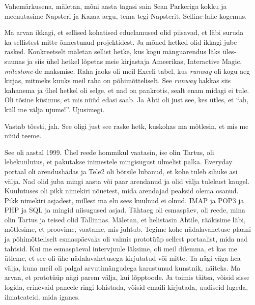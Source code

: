 Vahemärkusena, mäletan, mõni aasta  tagasi sain Sean Parkeriga kokku 
ja meenutasime  Napsteri ja Kazaa aegu, tema tegi Napsterit. Selline lahe 
kogemus.

Ma arvan ikkagi, et sellised kohatised eduelamused olid piisavad, et  läbi 
suruda ka sellistest mitte õnnestunud projektidest. Ja mõned hetked olid ikkagi 
jube rasked. Konkreetselt mäletan  sellist hetke, kus kogu mänguarendus läks 
üles-suunas ja siis ühel hetkel lõpetas meie kirjastaja Ameerikas, Interactive 
Magic, \emph{milestone}-de maksmise. Raha jaoks oli meil Exceli tabel, kus 
\emph{runway} oli kogu aeg kirjas, mitmeks kuuks  meil raha on põhimõtteliselt. 
See \emph{runway} hakkas siis kahanema ja ühel hetkel oli selge, et nad on 
pankrotis, sealt enam midagi ei tule. Oli tõsine küsimus, et mis nüüd edasi 
saab. Ja Ahti oli just see, kes ütles, et \enquote{ah, 
küll me välja ujume!}. Ujusimegi.


Vastab tõesti, jah. See oligi just see raske hetk, kuskohas ma mõtlesin, et mis 
me nüüd teeme.


See oli aastal 1999. Ühel reede hommikul vaatasin, ise olin Tartus, oli 
lehekuulutus, et pakutakse inimestele mingisugust ulmelist palka. Everyday portaal oli arendushädas ja Tele2 oli 
börsile lubanud, et kohe tuleb sihuke asi välja. Nad olid juba mingi aasta või 
paar arendanud ja olid välja tulekust kaugel. Kuulutuses oli  pikk nimekiri  
nõuetest, mida arendajad peaksid olema osanud. Pikk nimekiri asjadest, millest 
ma elu sees kuulnud ei olnud. IMAP ja POP3 ja PHP ja SQL ja mingid niisugused 
asjad. Tähtaeg oli esmaspäev, oli reede, mina olin Tartus ja teised olid 
Tallinnas. Mäletan, et helistasin Ahtile,  rääkisime 
läbi, mõtlesime, et proovime, vaatame, mis juhtub. Tegime kohe  nädalavahetuse 
plaani ja põhimõtteliselt esmaspäevaks oli valmis prototüüp sellest portaalist, 
mida nad tahtsid. Kui me esmaspäeval intervjuule läksime, oli meil dilemma, et 
kas me ütleme, et see oli ühe nädalavahetusega kirjutatud või mitte. Ta nägi 
väga hea välja, kuna meil oli palgal arvutimängudega karastunud kunstnik, 
näiteks. Ma arvan, et prototüüp nägi parem välja, kui lõpptoode. Ja toimis 
täitsa, võisid  sisse logida, erinevaid paneele ringi lohistada, võisid emaili 
kirjutada, uudiseid lugeda, ilmateateid, mida iganes. 

